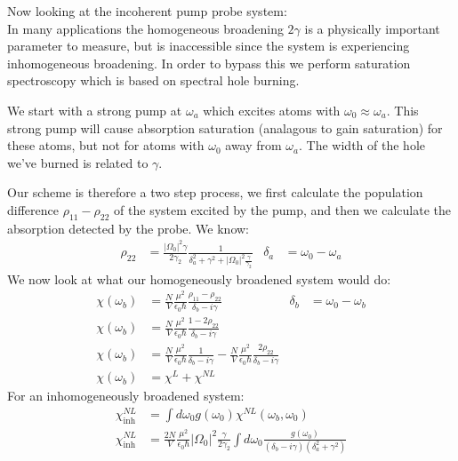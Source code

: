 Now looking at the incoherent pump probe system:\\
In many applications the homogeneous broadening $2\gamma$ is a physically important parameter to measure, but is inaccessible since the system is experiencing inhomogeneous broadening.
In order to bypass this we perform saturation spectroscopy which is based on spectral hole burning.

We start with a strong pump at $\omega_a$ which excites atoms with $\omega_0\approx\omega_a$. This strong pump will cause absorption saturation (analagous to gain saturation) for these atoms, but not for atoms with $\omega_0$ away from $\omega_a$.
The width of the hole we've burned is related to $\gamma$.

Our scheme is therefore a two step process, we first calculate the population difference $\rho_{11} - \rho_{22}$ of the system excited by the pump, and then we calculate the absorption detected by the probe.
We know:
\begin{align*}
	\rho_{22} &= \frac{|\Omega_0|^2 \gamma}{2\gamma_2} \frac{1}{\delta_a^2 + \gamma^2 + |\Omega_0|^2\frac{\gamma}{\gamma_2}} &
	\delta_a &= \omega_0 - \omega_a
\end{align*}
We now look at what our homogeneously broadened system would do:
\begin{align*}
	\chi(\omega_b) &= \frac{N}{V} \frac{\mu^2}{\epsilon_0\hbar} \frac{\rho_{11} - \rho_{22}}{\delta_b - i\gamma} &
	\delta_b &= \omega_0 - \omega_b \\
	\chi(\omega_b) &= \frac{N}{V} \frac{\mu^2}{\epsilon_0\hbar} \frac{1- 2\rho_{22}}{\delta_b - i\gamma} && \\
	\chi(\omega_b) &= \frac{N}{V} \frac{\mu^2}{\epsilon_0\hbar} \frac{1}{\delta_b - i\gamma} -\frac{N}{V} \frac{\mu^2}{\epsilon_0\hbar} \frac{2\rho_{22}}{\delta_b - i\gamma} && \\
	\chi(\omega_b) &= \chi^L + \chi^{NL} &&
\end{align*}
For an inhomogeneously broadened system:
\begin{align*}
	\chi_\text{inh}^{NL} &= \int d\omega_0 g(\omega_0) \chi^{NL}(\omega_b,\omega_0) \\
	\chi_\text{inh}^{NL} &= \frac{2N}{V} \frac{\mu^2}{\epsilon_0\hbar}|\Omega_0|^2 \frac{\gamma}{2\gamma_2}\int d\omega_0 \frac{g(\omega_0)}{(\delta_b - i\gamma)(\delta_a^2 + \gamma^2)}
\end{align*}
